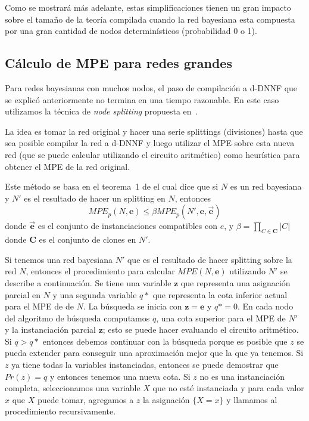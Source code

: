 \documentclass[11pt, letterpaper]{article}
\begin{document}
Como se mostrará más adelante, estas simplificaciones tienen un gran
impacto sobre el tamaño de la teoría compilada cuando la red bayesiana
esta compuesta por una gran cantidad de nodos determinísticos (probabilidad 0 o
1).


\subsection{Cálculo de MPE para redes grandes}
\label{sec:calculo-de-mpe}
Para redes bayesianas con muchos nodos, el paso de compilación a
d-DNNF que se explicó anteriormente no termina en una tiempo
razonable. En este caso utilizamos la técnica de \textsl{node
  splitting} propuesta en~\cite{ChoiChaviraDarwiche07}.

La idea es tomar la red original y hacer una serie splittings (divisiones)
hasta
que sea posible compilar la red a d-DNNF y luego utilizar el MPE sobre
esta nueva red (que se puede calcular utilizando el circuito
aritmético) como heurística para obtener el MPE de la red original.

Este método se basa en el teorema~1 de \cite{ChoiChaviraDarwiche07} el
cual dice que si $N$ es un red bayesiana y $N'$ es el resultado de
hacer un splitting en $N$, entonces
\begin{equation}
  \label{eq:2}
  MPE_p(N,\mathbf{e}) \leq \beta MPE_p(N', \mathbf{e}, \vec{\mathbf{e}})
\end{equation}
donde $\vec{\mathbf{e}}$ es el conjunto de instanciaciones compatibles con $e$,
y $\beta = \prod_{C \in \mathbf{C}} |C|$ donde $\mathbf{C}$ es el conjunto de
clones en $N'$.

Si tenemos una red bayesiana $N'$ que es el resultado de hacer
splitting sobre la red $N$, entonces el procedimiento para calcular
$MPE(N,\mathbf{e})$ utilizando $N'$ se describe a continuación. Se
tiene una variable $\mathbf{z}$ que representa una asignación parcial
en $N$ y una segunda variable $q*$ que representa la cota inferior
actual para el MPE de de $N$. La búsqueda se inicia con $\mathbf{z} =
\mathbf{e}$ y $q* = 0$. En cada nodo del algoritmo de búsqueda
computamos $q$, una cota superior para el MPE de $N'$ y la
instanciación parcial $\mathbf{z}$; esto se puede hacer evaluando el
circuito aritmético. Si $q>q*$ entonces debemos continuar con la
búsqueda porque es posible que $z$ se pueda extender para
conseguir una aproximación mejor que la que ya tenemos. Si $z$ ya
tiene todas la variables instanciadas, entonces se puede demostrar que
$Pr(z) = q$ y entonces tenemos una nueva cota. Si $z$ no es una
instanciación completa, seleccionamos una variable $X$ que no esté
instanciada y para cada valor $x$ que $X$ puede tomar, agregamos a $z$
la asignación $\{ X = x \}$ y llamamos al procedimiento recursivamente.
\end{document}
